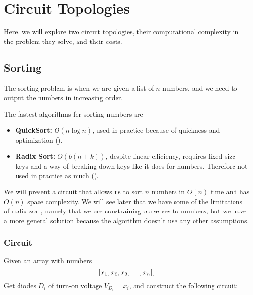 \section{Circuit Topologies}
Here, we will explore two circuit topologies, their computational complexity in the problem they solve, and their costs.

\subsection{Sorting}
\begin{definition}
  The sorting problem is when we are given a list of $n$ numbers, and we need to output the numbers in increasing order.
\end{definition}

The fastest algorithms for sorting numbers are

\begin{itemize}
  \item \textbf{QuickSort:} $O(n \log n)$, used in practice because of quickness and optimization (\cite{quicksort}).
  \item \textbf{Radix Sort:} $O(b(n+k))$, despite linear efficiency, requires fixed size keys and a way of breaking down keys like it does for numbers. Therefore not used in practice as much (\cite{radix_sort}).
\end{itemize}

We will present a circuit that allows us to sort $n$ numbers in $O(n)$ time and has $O(n)$ space complexity.
We will see later that we have some of the limitations of radix sort, namely that we are constraining ourselves to numbers, but we have a more general solution because the algorithm doesn't use any other assumptions.

\subsubsection{Circuit}

Given an array with numbers
\begin{equation*}
  \pbra{
    x_1, x_2, x_3, \dots, x_n
  },
\end{equation*}
Get diodes $D_i$ of turn-on voltage $V_{D_i} = x_i$, and construct the following circuit:

